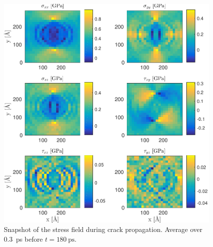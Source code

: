 \begin{figure}
\includegraphics[width=\textwidth]{../figures/thesis/stressfield_snap_propagation_180.pdf}
\caption{Snapshot of the stress field during crack propagation. Average over \SI{0.3}{\pico\second} before $t = \SI{180}{\pico\second}$.}
\label{fig:stressfield_snap_propagation_180}
\end{figure}


